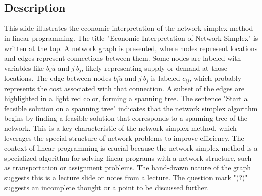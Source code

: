 \documentclass{article}%
\begin{document}
 \\
 \\
%
\subsection{Description}%
This slide illustrates the economic interpretation of the network simplex method in linear programming. The title "Economic Interpretation of Network Simplex" is written at the top. A network graph is presented, where nodes represent locations and edges represent connections between them.  Some nodes are labeled with variables like $b_i \tilde{u}$ and $j \ b_j$, likely representing supply or demand at those locations. The edge between nodes $b_i \tilde{u}$ and $j \ b_j$ is labeled $c_{ij}$, which probably represents the cost associated with that connection. A subset of the edges are highlighted in a light red color, forming a spanning tree. The sentence "Start a feasible solution on a spanning tree" indicates that the network simplex algorithm begins by finding a feasible solution that corresponds to a spanning tree of the network. This is a key characteristic of the network simplex method, which leverages the special structure of network problems to improve efficiency. The context of linear programming is crucial because the network simplex method is a specialized algorithm for solving linear programs with a network structure, such as transportation or assignment problems. The hand-drawn nature of the graph suggests this is a lecture slide or notes from a lecture. The question mark "(?)" suggests an incomplete thought or a point to be discussed further.%
\end{document}
